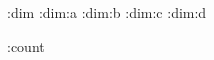 \newbox\transbox


\newcount\transfactor
{}


\newdimen\trans:dim
\newdimen\trans:dim:a
\newdimen\trans:dim:b
\newdimen\trans:dim:c
\newdimen\trans:dim:d

\newcount\trans:count

\def\trans:def{}
\def\trans:def:a{}
\def\trans:def:b{}
\def\trans:def:c{}
\def\trans:def:d{}


\def\transboxini{%
 \afterassignment\transboxcheck
 \setbox\transbox}

\def\transboxcheck{%
 \ifvoid\transbox
  \expandafter\aftergroup
 \fi\transboxtodo}


\def\transhboxini{%
 \afterassignment\transhboxcheck
 \setbox\transbox}

\def\transhboxcheck{%
 \ifvoid\transbox
  \expandafter\aftergroup\expandafter\transhboxwrap
 \else
  \expandafter\transhboxwrap
 \fi}

\def\transhboxwrap{%
 \ifvbox\transbox
  \setbox\transbox\hbox{\box\transbox}%
 \fi
 \transboxtodo}

